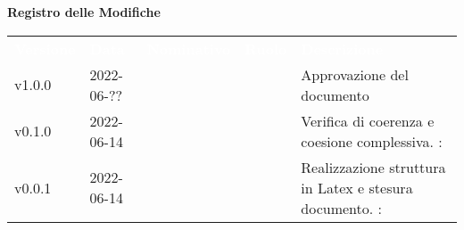 

{\LARGE{\textbf{Registro delle Modifiche}}} \\
\begin{table}[!htbp]
	\renewcommand{\arraystretch}{1.5}
	\begin{tabular}{ m{}<{\centering}  m{}<{\centering}  m{}<{\centering}  m{}<{\centering}  m{}<{\centering} }
		\rowcolor{darkblue}
		\textcolor{white}{\textbf{Versione}} & \textcolor{white}{\textbf{Data}} & \textcolor{white}{\textbf{Nominativo}} & \textcolor{white}{\textbf{Ruolo}} & \textcolor{white}{\textbf{Descrizione}}                              \\
		v1.0.0                               & 2022-06-??                  & \FP                                       & \RE                               & Approvazione del documento                                           \\

		v0.1.0                               & 2022-06-14                      & \PV                                    & \AN                               & Verifica di coerenza e coesione complessiva. \VE: \textit{}          \\

		v0.0.1                               & 2022-06-14                       & \PV                                    & \AN                               & Realizzazione struttura in Latex e stesura documento. \VE: \textit{} \\
	\end{tabular}
\end{table}

\pagebreak